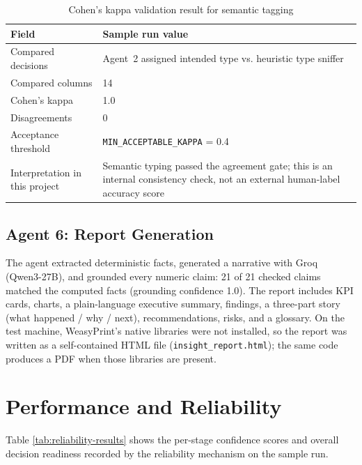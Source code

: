 \documentclass[12pt,a4paper,openany]{report}
\begin{document}
\begin{table}[H]
\centering
\caption{Cohen's kappa validation result for semantic tagging}
\label{tab:kappa-results}
\begin{tabular}{p{5cm} p{7cm}}
\hline
Field & Sample run value \\
\hline
Compared decisions & Agent~2 assigned intended type vs. heuristic type sniffer \\
Compared columns & 14 \\
Cohen's kappa & 1.0 \\
Disagreements & 0 \\
Acceptance threshold & \texttt{MIN\_ACCEPTABLE\_KAPPA} = 0.4 \\
Interpretation in this project & Semantic typing passed the agreement gate; this is an internal consistency check, not an external human-label accuracy score \\
\hline
\end{tabular}
\end{table}

\subsection{Agent 6: Report Generation}
The agent extracted deterministic facts, generated a narrative with Groq (Qwen3-27B), and grounded every numeric claim: 21 of 21 checked claims matched the computed facts (grounding confidence 1.0). The report includes KPI cards, charts, a plain-language executive summary, findings, a three-part story (what happened / why / next), recommendations, risks, and a glossary. On the test machine, WeasyPrint's native libraries were not installed, so the report was written as a self-contained HTML file (\texttt{insight\_report.html}); the same code produces a PDF when those libraries are present.

\section{Performance and Reliability}

Table \ref{tab:reliability-results} shows the per-stage confidence scores and overall decision readiness recorded by the reliability mechanism on the sample run.
\end{document}
